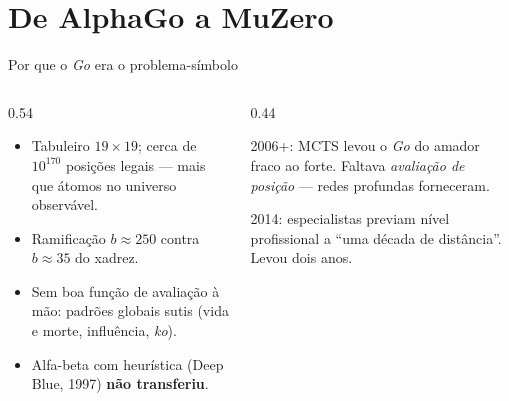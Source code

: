 \documentclass[aspectratio=169, 11pt]{beamer}
\begin{document}
\section{De AlphaGo a MuZero}

\begin{frame}{Por que o \emph{Go} era o problema-símbolo}
  \begin{columns}[T]
    \begin{column}{0.54\textwidth}
      \begin{itemize}
        \item Tabuleiro $19\times19$; cerca de $10^{170}$ posições legais --- mais que átomos no universo observável.
        \item Ramificação $b\approx 250$ contra $b\approx 35$ do xadrez.
        \item Sem boa função de avaliação à mão: padrões globais sutis (vida e morte, influência, \emph{ko}).
        \item Alfa-beta com heurística (Deep Blue, 1997) \textbf{não transferiu}.
      \end{itemize}
    \end{column}
    \begin{column}{0.44\textwidth}
      \begin{ideiabox}
        2006+: MCTS levou o \emph{Go} do amador fraco ao forte. Faltava \emph{avaliação de posição} — redes profundas forneceram.
      \end{ideiabox}
      \begin{alertabox}
        2014: especialistas previam nível profissional a ``uma década de distância''. Levou dois anos.
      \end{alertabox}
    \end{column}
  \end{columns}
\end{frame}
\end{document}

